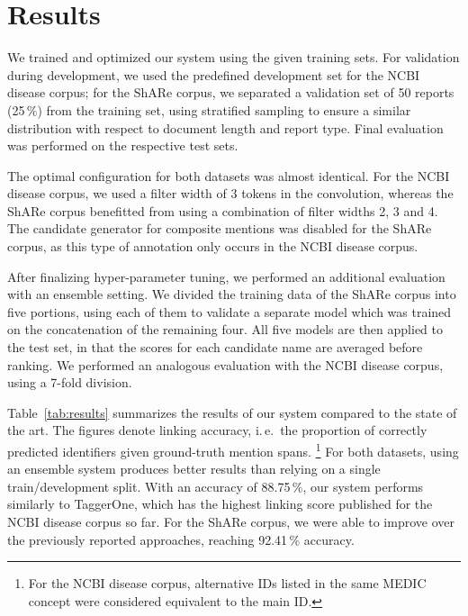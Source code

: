 \documentclass{bioinfo}
\newcommand{\ie}{i.\,e.\ }
\begin{document}



\section{Results}

We trained and optimized our system using the given training sets.
For validation during development, we used the predefined development set for the NCBI disease corpus; for the ShARe corpus, we separated a validation set of 50 reports (25\,\%) from the training set, using stratified sampling to ensure a similar distribution with respect to document length and report type.
Final evaluation was performed on the respective test sets.

The optimal configuration for both datasets was almost identical.
For the NCBI disease corpus, we used a filter width of 3 tokens in the convolution, whereas the ShARe corpus benefitted from using a combination of filter widths 2, 3 and 4.
The candidate generator for composite mentions was disabled for the ShARe corpus, as this type of annotation only occurs in the NCBI disease corpus.

After finalizing hyper-parameter tuning, we performed an additional evaluation with an ensemble setting.
We divided the training data of the ShARe corpus into five portions, using each of them to validate a separate model which was trained on the concatenation of the remaining four.
All five models are then applied to the test set, in that the scores for each candidate name are averaged before ranking.
We performed an analogous evaluation with the NCBI disease corpus, using a 7-fold division.

Table~\ref{tab:results} summarizes the results of our system compared to the state of the art.
The figures denote linking accuracy, \ie the proportion of correctly predicted identifiers given ground-truth mention spans.%
\footnote{For the NCBI disease corpus, alternative IDs listed in the same MEDIC concept were considered equivalent to the main ID.}  %
For both datasets, using an ensemble system produces better results than relying on a single train/development split.
With an accuracy of 88.75\,\%, our system performs similarly to TaggerOne, which has the highest linking score published for the NCBI disease corpus so far.
For the ShARe corpus, we were able to improve over the previously reported approaches, reaching 92.41\,\% accuracy.
\end{document}
